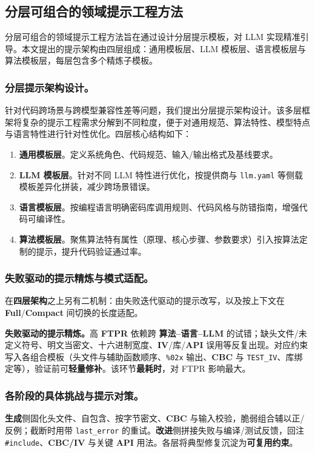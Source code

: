 \documentclass[runningheads]{llncs}
\begin{document}
\subsection{分层可组合的领域提示工程方法}
分层可组合的领域提示工程方法旨在通过设计分层提示模板，对 LLM 实现精准引导。本文提出的提示架构由四层组成：通用模板层、LLM 模板层、语言模板层与算法模板层，每层包含多个精炼子模板。

\subsubsection{分层提示架构设计。}
针对代码跨场景与跨模型兼容性差等问题，我们提出分层提示架构设计。该多层框架将复杂的提示工程需求分解到不同粒度，便于对通用规范、算法特性、模型特点与语言特性进行针对性优化。四层核心结构如下：

\begin{enumerate}
    \item \textbf{通用模板层}。定义系统角色、代码规范、输入/输出格式及基线要求。
    \item \textbf{LLM 模板层}。针对不同 LLM 特性进行优化，按提供商与 \texttt{llm.yaml} 等侧载模板差异化拼装，减少跨场景错误。
    \item \textbf{语言模板层}。按编程语言明确密码库调用规则、代码风格与防错指南，增强代码可编译性。
    \item \textbf{算法模板层}。聚焦算法特有属性（原理、核心步骤、参数要求）引入按算法定制的提示，提升代码验证通过率。


\end{enumerate}

\subsubsection{失败驱动的提示精炼与模式适配。}
在\textbf{四层架构}之上另有二机制：由失败迭代驱动的提示改写，以及按上下文在 \textbf{Full}/\textbf{Compact} 间切换的长度适配。

\textbf{失败驱动的提示精炼。}高 \textbf{FTPR} 依赖跨 \textbf{算法–语言–LLM} 的试错；缺头文件/未定义符号、明文当密文、十六进制宽度、\textbf{IV}/库/\textbf{API} 误用等反复出现。对应约束写入各组合模板（头文件与辅助函数顺序、\texttt{\%02x} 输出、\textbf{CBC} 与 \texttt{TEST\_IV}、库绑定等），验证前可\textbf{轻量修补}。该环节\textbf{最耗时}，对 FTPR 影响最大。

\subsubsection{各阶段的具体挑战与提示对策。}
\label{subsec:challenges_prompt_table}
\textbf{生成}侧固化头文件、自包含、按字节密文、\textbf{CBC} 与输入校验，脆弱组合辅以正/反例；截断时用带 \texttt{last\_error} 的重试。\textbf{改进}侧拼接失败与编译/测试反馈，回注 \texttt{\#include}、\textbf{CBC/IV} 与关键 \textbf{API} 用法。各层将典型修复沉淀为\textbf{可复用约束}。
\end{document}
